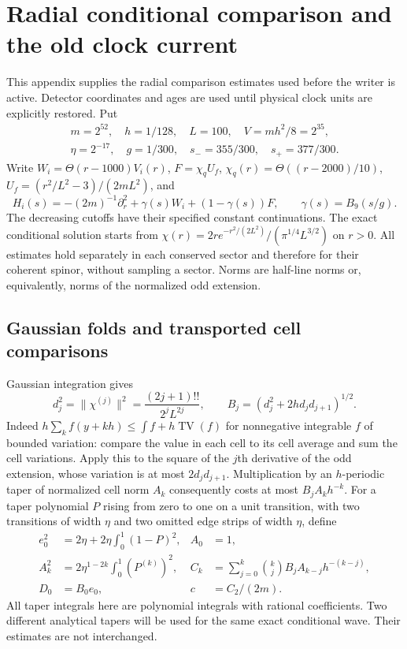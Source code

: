\documentclass[11pt]{article}
\theoremstyle{definition}\newtheorem{definition}[theorem]{Definition}
\theoremstyle{remark}\newtheorem{remark}[theorem]{Remark}
\newcommand{\TV}{\operatorname{TV}}\newcommand{\Var}{\operatorname{Var}}
\begin{document}
\section{Radial conditional comparison and the old clock current}
\label{old:activation}\label{old:main}
This appendix supplies the radial comparison estimates used before the
writer is active. Detector coordinates and ages are used until physical
clock units are explicitly restored. Put
\[
 \begin{gathered}
 m=2^{52},\quad h=1/128,\quad L=100,\quad V=mh^2/8=2^{35},\\
 \eta=2^{-17},\quad g=1/300,\quad s_-=355/300,\quad s_+=377/300.
 \end{gathered}
\]
Write $W_i=\Theta(r-1000)V_i(r)$, $F=\chi_q U_f$, $\chi_q(r)=\Theta((r-2000)/10)$,
$U_f=(r^2/L^2-3)/(2mL^2)$, and
\[
 H_i(s)=-(2m)^{-1}\partial_r^2+\gamma(s)W_i+(1-\gamma(s))F,
 \qquad \gamma(s)=B_9(s/g).
\]
The decreasing cutoffs have their specified constant continuations.
The exact conditional solution starts from
$\chi(r)=2r e^{-r^2/(2L^2)}/(\pi^{1/4}L^{3/2})$ on $r>0$.
All estimates hold separately in each conserved sector and therefore for
their coherent spinor, without sampling a sector. Norms are half-line
norms or, equivalently, norms of the normalized odd extension.

\subsection{Gaussian folds and transported cell comparisons}\label{old:lens}
Gaussian integration gives
\[
 d_j^2=\|\chi^{(j)}\|^2=\frac{(2j+1)!!}{2^jL^{2j}},\qquad
 B_j=(d_j^2+2h d_jd_{j+1})^{1/2}.
\]
Indeed $h\sum_k f(y+kh)\leq\int f+h\TV(f)$ for nonnegative
integrable $f$ of bounded variation: compare the value in each cell to its
cell average and sum the cell variations. Apply this to the square of
the $j$th derivative of the odd extension, whose variation is at most
$2d_jd_{j+1}$. Multiplication by an $h$-periodic taper of normalized cell
norm $A_k$ consequently costs at most $B_jA_kh^{-k}$.
For a taper polynomial $P$ rising from zero to one on a unit transition,
with two transitions of width $\eta$ and two omitted edge strips of width
$\eta$, define
\begin{align*}
 e_0^2&=2\eta+2\eta\int_0^1(1-P)^2, & A_0&=1,\\
 A_k^2&=2\eta^{1-2k}\int_0^1(P^{(k)})^2,&
 C_k&=\sum_{j=0}^k\binom kj B_j A_{k-j}h^{-(k-j)},\\
 D_0&=B_0e_0,& c&=C_2/(2m).
\end{align*}
All taper integrals here are polynomial integrals with rational
coefficients. Two different analytical tapers will be used for the same
exact conditional wave. Their estimates are not interchanged.
\end{document}
